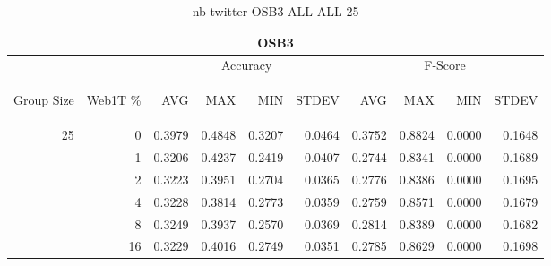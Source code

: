 \begin{center}
\begin{table}[htbp]
\begin{tabular}{ | r | r | r | r | r | r | r | r | r | r |}
\hline
\multicolumn{10}{|c|}{OSB3}\\
\hline
 & & \multicolumn{4}{|c|}{Accuracy} & \multicolumn{4}{|c|}{F-Score}\\ \cline{3-10}
\begin{sideways}Group Size\end{sideways} & \begin{sideways}Web1T \%\end{sideways} & \begin{sideways}AVG\end{sideways} & \begin{sideways}MAX\end{sideways} & \begin{sideways}MIN\end{sideways} & \begin{sideways}STDEV\end{sideways} & \begin{sideways}AVG\end{sideways} & \begin{sideways}MAX\end{sideways} & \begin{sideways}MIN\end{sideways} & \begin{sideways}STDEV\end{sideways}\\
\hline
\multirow{5}{*}{25}
 & 0 & 0.3979 & 0.4848 & 0.3207 & 0.0464 & 0.3752 & 0.8824 & 0.0000 & 0.1648\\ \cline{2-10}
 & 1 & 0.3206 & 0.4237 & 0.2419 & 0.0407 & 0.2744 & 0.8341 & 0.0000 & 0.1689\\ \cline{2-10}
 & 2 & 0.3223 & 0.3951 & 0.2704 & 0.0365 & 0.2776 & 0.8386 & 0.0000 & 0.1695\\ \cline{2-10}
 & 4 & 0.3228 & 0.3814 & 0.2773 & 0.0359 & 0.2759 & 0.8571 & 0.0000 & 0.1679\\ \cline{2-10}
 & 8 & 0.3249 & 0.3937 & 0.2570 & 0.0369 & 0.2814 & 0.8389 & 0.0000 & 0.1682\\ \cline{2-10}
 & 16 & 0.3229 & 0.4016 & 0.2749 & 0.0351 & 0.2785 & 0.8629 & 0.0000 & 0.1698\\ \cline{2-10}
\hline
\end{tabular}
\caption{nb-twitter-OSB3-ALL-ALL-25}
\label{table:nb-twitter-OSB3-ALL-ALL-25}
\end{table}
\end{center}


